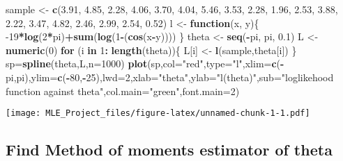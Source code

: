 \documentclass[]{article}
\newenvironment{Shaded}{\begin{snugshade}}{\end{snugshade}}
\newcommand{\ControlFlowTok}[1]{\textcolor[rgb]{0.13,0.29,0.53}{\textbf{#1}}}
\newcommand{\DataTypeTok}[1]{\textcolor[rgb]{0.13,0.29,0.53}{#1}}
\newcommand{\DecValTok}[1]{\textcolor[rgb]{0.00,0.00,0.81}{#1}}
\newcommand{\FloatTok}[1]{\textcolor[rgb]{0.00,0.00,0.81}{#1}}
\newcommand{\KeywordTok}[1]{\textcolor[rgb]{0.13,0.29,0.53}{\textbf{#1}}}
\newcommand{\NormalTok}[1]{#1}
\newcommand{\OperatorTok}[1]{\textcolor[rgb]{0.81,0.36,0.00}{\textbf{#1}}}
\newcommand{\StringTok}[1]{\textcolor[rgb]{0.31,0.60,0.02}{#1}}
\begin{document}
\begin{Shaded}
\begin{Highlighting}[]
\NormalTok{sample <-}\StringTok{ }\KeywordTok{c}\NormalTok{(}\FloatTok{3.91}\NormalTok{, }\FloatTok{4.85}\NormalTok{, }\FloatTok{2.28}\NormalTok{, }\FloatTok{4.06}\NormalTok{, }\FloatTok{3.70}\NormalTok{, }\FloatTok{4.04}\NormalTok{, }\FloatTok{5.46}\NormalTok{, }\FloatTok{3.53}\NormalTok{, }\FloatTok{2.28}\NormalTok{, }\FloatTok{1.96}\NormalTok{,}
       \FloatTok{2.53}\NormalTok{, }\FloatTok{3.88}\NormalTok{, }\FloatTok{2.22}\NormalTok{, }\FloatTok{3.47}\NormalTok{, }\FloatTok{4.82}\NormalTok{, }\FloatTok{2.46}\NormalTok{, }\FloatTok{2.99}\NormalTok{, }\FloatTok{2.54}\NormalTok{, }\FloatTok{0.52}\NormalTok{)}
\NormalTok{l <-}\StringTok{ }\ControlFlowTok{function}\NormalTok{(x, y)\{}
  \DecValTok{-19}\OperatorTok{*}\KeywordTok{log}\NormalTok{(}\DecValTok{2}\OperatorTok{*}\NormalTok{pi)}\OperatorTok{+}\KeywordTok{sum}\NormalTok{(}\KeywordTok{log}\NormalTok{(}\DecValTok{1}\OperatorTok{-}\NormalTok{(}\KeywordTok{cos}\NormalTok{(x}\OperatorTok{-}\NormalTok{y))))}
\NormalTok{\}}
\NormalTok{theta <-}\StringTok{ }\KeywordTok{seq}\NormalTok{(}\OperatorTok{-}\NormalTok{pi, pi, }\FloatTok{0.1}\NormalTok{)}
\NormalTok{L <-}\StringTok{ }\KeywordTok{numeric}\NormalTok{(}\DecValTok{0}\NormalTok{)}
\ControlFlowTok{for}\NormalTok{ (i }\ControlFlowTok{in} \DecValTok{1}\OperatorTok{:}\StringTok{ }\KeywordTok{length}\NormalTok{(theta))\{}
\NormalTok{   L[i] <-}\StringTok{ }\KeywordTok{l}\NormalTok{(sample,theta[i])}
\NormalTok{\}}
\NormalTok{ sp=}\KeywordTok{spline}\NormalTok{(theta,L,}\DataTypeTok{n=}\DecValTok{1000}\NormalTok{)}
 \KeywordTok{plot}\NormalTok{(sp,}\DataTypeTok{col=}\StringTok{"red"}\NormalTok{,}\DataTypeTok{type=}\StringTok{"l"}\NormalTok{,}\DataTypeTok{xlim=}\KeywordTok{c}\NormalTok{(}\OperatorTok{-}\NormalTok{pi,pi),}\DataTypeTok{ylim=}\KeywordTok{c}\NormalTok{(}\OperatorTok{-}\DecValTok{80}\NormalTok{,}\OperatorTok{-}\DecValTok{25}\NormalTok{),}\DataTypeTok{lwd=}\DecValTok{2}\NormalTok{,}\DataTypeTok{xlab=}\StringTok{"theta"}\NormalTok{,}\DataTypeTok{ylab=}\StringTok{"l(theta)"}\NormalTok{,}\DataTypeTok{sub=}\StringTok{"loglikehood function against theta"}\NormalTok{,}\DataTypeTok{col.main=}\StringTok{"green"}\NormalTok{,}\DataTypeTok{font.main=}\DecValTok{2}\NormalTok{)}
\end{Highlighting}
\end{Shaded}

\texttt{[image: MLE\_Project\_files/figure-latex/unnamed-chunk-1-1.pdf]}

\hypertarget{find-method-of-moments-estimator-of-theta}{%
\subsection{Find Method of moments estimator of
theta}\label{find-method-of-moments-estimator-of-theta}}
\end{document}
